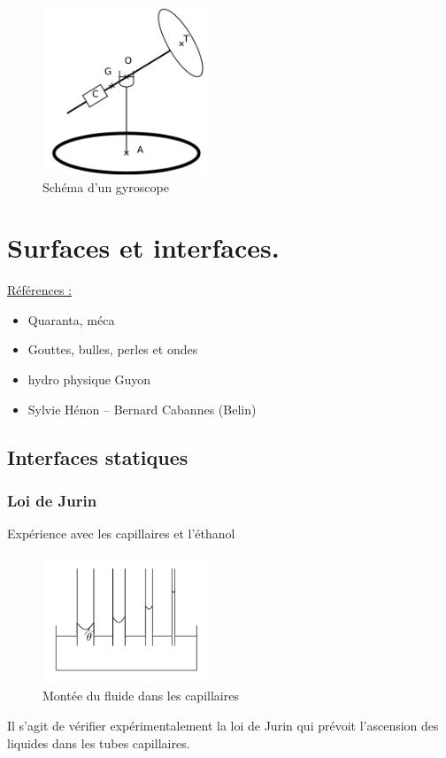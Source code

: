 \documentclass{article}%
\begin{document}
\begin{figure}
      \centerline{\includegraphics[width=5cm]{images-exp/MecaGyroscope.png}}
 \caption{Schéma d'un gyroscope}
\end{figure}

\section{Surfaces et interfaces.}

\underline{Références :}
\begin{itemize}
	\item Quaranta, méca
	\item Gouttes, bulles, perles et ondes
	\item hydro physique Guyon
	\item Sylvie Hénon – Bernard Cabannes (Belin)
\end{itemize}

\subsection{Interfaces statiques}
\subsubsection{Loi de Jurin}
Expérience avec les capillaires et l'éthanol
\begin{figure}
      \centerline{\includegraphics[width=5cm]{images-exp/Jurin1.png}}
 \caption{Montée du fluide dans les capillaires}
\end{figure}

Il s'agit de vérifier expérimentalement la loi de Jurin qui prévoit l'ascension des liquides dans les tubes capillaires.
\end{document}
